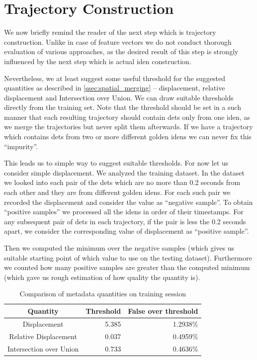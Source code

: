 \section{Trajectory Construction}

We now briefly remind the reader of the next step which is trajectory construction. Unlike in case of feature vectors we do not conduct thorough evaluation of various approaches, as the desired result of this step is strongly influenced by the next step which is actual \gls{iden} construction.

Nevertheless, we at least suggest some useful threshold for the suggested quantities as described in \autoref{ssec:spatial_merging} -- displacement, relative displacement and Intersection over Union. We can draw suitable thresholds directly from the training set. Note that the threshold should be set in a such manner that each resulting trajectory should contain \glspl{det} only from one \gls{iden}, as we merge the trajectories but never split them afterwards. If we have a trajectory which contains \glspl{det} from two or more different golden \glspl{iden} we can never fix this ``impurity''.

This leads us to simple way to suggest suitable thresholds. For now let us consider simple displacement. We analyzed the training dataset. In the dataset we looked into each pair of the \glspl{det} which are no more than 0.2 seconds from each other and they are from different golden \glspl{iden}. For each such pair we recorded the displacement and consider the value as ``negative sample''. To obtain ``positive samples'' we processed all the \glspl{iden} in order of their timestamps. For any subsequent pair of \glspl{det} in each trajectory, if the pair is less the 0.2 seconds apart, we consider the corresponding value of displacement as ``positive sample''.

Then we computed the minimum over the negative samples (which gives us suitable starting point of which value to use on the testing dataset). Furthermore we counted how many positive samples are greater than the computed minimum (which gave us rough estimation of how quality the quantity is).

\begin{table}[]
    \centering
    \begin{tabular}{c|r|r}
         Quantity & Threshold & False over threshold  \\ \hline
         Displacement & 5.385 & 1.2938\% \\
         Relative Displacement & 0.037 & 0.4959\% \\
         Intersection over Union & 0.733 & 0.4636\%
    \end{tabular}
    \caption{Comparison of metadata quantities on training session}
    \label{tab:metadata_comparison}
\end{table}

